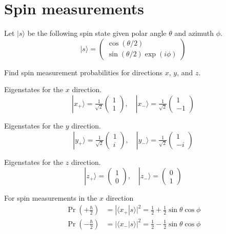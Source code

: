 

\section*{Spin measurements}

Let $|s\rangle$ be the following spin state given polar angle $\theta$ and azimuth $\phi$.
\begin{equation*}
|s\rangle=\begin{pmatrix}
\cos(\theta/2)
\\
\sin(\theta/2)\exp(i\phi)
\end{pmatrix}
\end{equation*}

Find spin measurement probabilities for directions $x$, $y$, and $z$.

\bigskip
Eigenstates for the $x$ direction.
\begin{equation*}
|x_+\rangle=\tfrac{1}{\sqrt2}\begin{pmatrix}1\\1\end{pmatrix},
\quad
|x_-\rangle=\tfrac{1}{\sqrt2}\begin{pmatrix}1\\-1\end{pmatrix}
\end{equation*}

Eigenstates for the $y$ direction.
\begin{equation*}
|y_+\rangle=\tfrac{1}{\sqrt2}\begin{pmatrix}1\\i\end{pmatrix},
\quad
|y_-\rangle=\tfrac{1}{\sqrt2}\begin{pmatrix}1\\-i\end{pmatrix}
\end{equation*}

Eigenstates for the $z$ direction.
\begin{equation*}
|z_+\rangle=\begin{pmatrix}1\\0\end{pmatrix},
\quad
|z_-\rangle=\begin{pmatrix}0\\1\end{pmatrix}
\end{equation*}

For spin measurements in the $x$ direction
\begin{align*}
\Pr\left(+\tfrac{\hbar}{2}\right)&=|\langle x_+|s\rangle|^2=\tfrac{1}{2}+\tfrac{1}{2}\sin\theta\cos\phi
\\
\Pr\left(-\tfrac{\hbar}{2}\right)&=|\langle x_-|s\rangle|^2=\tfrac{1}{2}-\tfrac{1}{2}\sin\theta\cos\phi
\end{align*}

